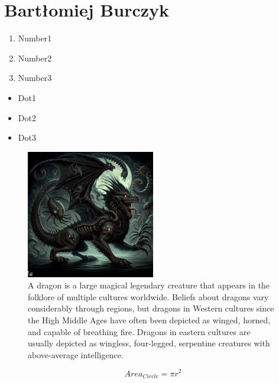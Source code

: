 \section{Bartłomiej Burczyk}
\label{sec:Bartlomiej}

\begin{enumerate}
    \item Number1
    \item Number2
    \item Number3
\end{enumerate}

\begin{itemize}
    \item Dot1
    \item Dot2
    \item Dot3
\end{itemize}





\begin{figure}[htbp]
    \centering
    \caption{A dragon is a large magical legendary creature that appears in the folklore of multiple cultures worldwide. Beliefs about dragons vary considerably through regions, but dragons in Western cultures since the High Middle Ages have often been depicted as winged, horned, and capable of breathing fire.
    Dragons in eastern cultures are usually depicted as wingless, four-legged, serpentine creatures with above-average intelligence.}
    \includegraphics[width=0.5\textwidth]{pictures/dragon.jpg}

    \label{fig:dragon}
\end{figure}


\begin{figure}[ht]
    \[Area_{Circle}=\pi r^2\]
\end{figure}



